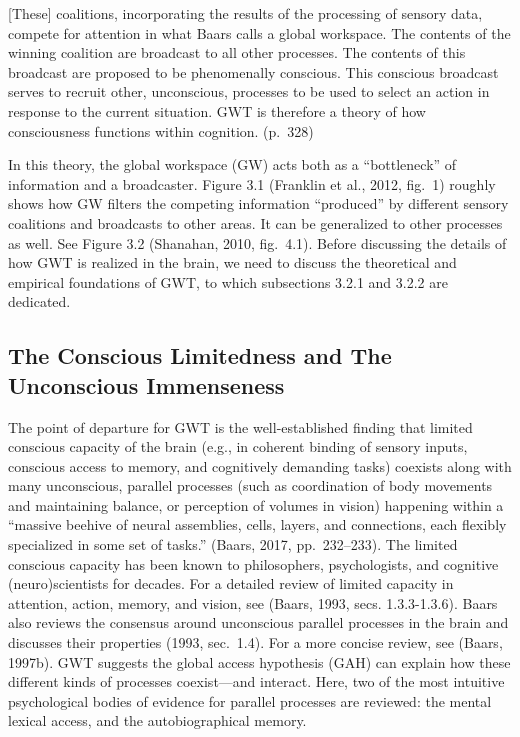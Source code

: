 \documentclass[12pt,twoside]{reedthesis}
\begin{document}
{[}These{]} coalitions, incorporating the results of the processing of sensory data, compete for attention in what Baars calls a global workspace. The contents of the winning coalition are broadcast to all other processes. The contents of this broadcast are proposed to be phenomenally conscious. This conscious broadcast serves to recruit other, unconscious, processes to be used to select an action in response to the current situation. GWT is therefore a theory of how consciousness functions within cognition. (p.~328)

In this theory, the global workspace (GW) acts both as a ``bottleneck'' of information and a broadcaster. Figure 3.1 (Franklin et al., 2012, fig.~1) roughly shows how GW filters the competing information ``produced'' by different sensory coalitions and broadcasts to other areas. It can be generalized to other processes as well. See Figure 3.2 (Shanahan, 2010, fig.~4.1). Before discussing the details of how GWT is realized in the brain, we need to discuss the theoretical and empirical foundations of GWT, to which subsections 3.2.1 and 3.2.2 are dedicated.

\hypertarget{the-conscious-limitedness-and-the-unconscious-immenseness}{%
\subsection{The Conscious Limitedness and The Unconscious Immenseness}\label{the-conscious-limitedness-and-the-unconscious-immenseness}}

The point of departure for GWT is the well-established finding that limited conscious capacity of the brain (e.g., in coherent binding of sensory inputs, conscious access to memory, and cognitively demanding tasks) coexists along with many unconscious, parallel processes (such as coordination of body movements and maintaining balance, or perception of volumes in vision) happening within a ``massive beehive of neural assemblies, cells, layers, and connections, each flexibly specialized in some set of tasks.'' (Baars, 2017, pp.~232--233). The limited conscious capacity has been known to philosophers, psychologists, and cognitive (neuro)scientists for decades. For a detailed review of limited capacity in attention, action, memory, and vision, see (Baars, 1993, secs. 1.3.3-1.3.6). Baars also reviews the consensus around unconscious parallel processes in the brain and discusses their properties (1993, sec.~1.4). For a more concise review, see (Baars, 1997b). GWT suggests the global access hypothesis (GAH) can explain how these different kinds of processes coexist---and interact. Here, two of the most intuitive psychological bodies of evidence for parallel processes are reviewed: the mental lexical access, and the autobiographical memory.
\end{document}
